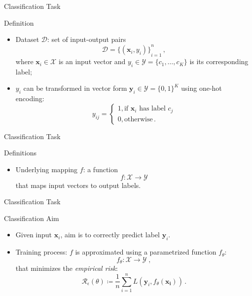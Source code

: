 \begin{frame}{Classification Task}
    \begin{definitionblock}{Definition}
        \centering
        \begin{itemize}
            \item<1-> Dataset $\mathcal{D}$: set of input-output pairs
            \[
                \mathcal{D} = {\{(\mathbf{x}_i, y_i)\}}_{i=1}^n\,,
            \]
            where $\mathbf{x}_i \in \mathcal{X}$ is an input vector and $y_i\in \mathcal{Y} = \{c_1, \dots, c_K\}$ is its corresponding label;
            \item<2-> $y_i$ can be transformed in vector form $\mathbf{y}_i\in \mathcal{Y} = {\{0,1\}}^K$ using one-hot encoding:
            \[
                y_{ij} = 
                \begin{cases}
                    1, \text{if $\mathbf{x}_i$ has label $c_j$}\\
                    0, \text{otherwise}\,.
                \end{cases}
            \]
        \end{itemize}
    \end{definitionblock}
\end{frame}

\begin{frame}{Classification Task}
    \begin{definitionblock}{Definitions}
        \centering
        \begin{itemize}
            \item<1-> Underlying mapping $f$: a function
            \[
                f:\mathcal{X} \to \mathcal{Y}
            \]
            that maps input vectors to output labels.
        \end{itemize}
    \end{definitionblock}
\end{frame}

\begin{frame}{Classification Task}
    \begin{normalblock}{Classification Aim}
        \centering
        \begin{itemize}
            \item<1-> Given input $\mathbf{x}_i$, aim is to correctly predict label $\mathbf{y}_i$.
            \item<2-> Training process: $f$ is approximated using a parametrized function $f_{\theta}$:
            \[
                f_{\theta}: \mathcal{X} \to \mathcal{Y}\;,
            \]
            that minimizes the \emph{empirical risk}: 
            \[
                \mathcal{R}_{\epsilon}(\theta) \coloneqq \frac{1}{n}\sum_{i=1}^{n} L(\mathbf{y}_i,f_{\theta}(\mathbf{x_i}))\,.
            \]
        \end{itemize}
    \end{normalblock}
\end{frame}

